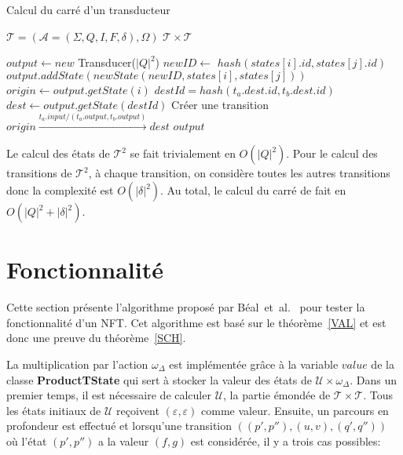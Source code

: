 	\begin{algorithm}
		\caption{Calcul du carré d'un transducteur}
		\label{square}
		\begin{algorithmic}[1]
			\Require $\mathscr{T} = (\mathscr{A} = (\Sigma,Q,I,F,\delta), \Omega)$
			\Ensure $\mathscr{T} \times \mathscr{T}$
			
			\Statex
			\State $output \leftarrow new$ Transducer($|Q|^2$)
			\Statex
			\Statex
					\State $newID \leftarrow$ $hash(states[i].id, states[j].id)$
					\State $output.addState(new State(newID, states[i], states[j]))$
				\EndFor
			\EndFor
			\Statex
			\Statex
				\State $origin \leftarrow output.getState(i)$
							\State $destId = hash(t_a.dest.id, t_b.dest.id)$
							\State $dest \leftarrow output.getState(destId)$
							\State Créer une transition $origin \xrightarrow{t_a.input / (t_a.output, t_b.output)} dest$
						\EndIf
					\EndFor
				\EndFor
			\EndFor
			\Statex
			\Return $output$
		\end{algorithmic}
	\end{algorithm}
	
	Le calcul des états de $\mathscr{T}^2$ se fait trivialement en $O(|Q|^2)$. Pour le calcul des transitions de $\mathscr{T}^2$, à chaque transition, on considère toutes les autres transitions donc la complexité est $O(|\delta|^2)$. Au total, le calcul du carré de fait en $O(|Q|^2 + |\delta|^2)$.
	
\section{Fonctionnalité}
\label{functionnal}

	Cette section présente l'algorithme proposé par Béal~et~al.~\cite{Bea03}  pour tester la fonctionnalité d'un NFT. Cet algorithme est basé sur le théorème~\ref{VAL} et est donc une preuve du théorème~\ref{SCH}.

	La multiplication par l'action $\omega_\Delta$ est implémentée grâce à la variable $value$ de la classe \textbf{ProductTState} qui sert à stocker la valeur des états de $\mathscr{U} \times \omega_\Delta$. Dans un premier temps, il est nécessaire de calculer $\mathscr{U}$, la partie émondée de $\mathscr{T} \times \mathscr{T}$. Tous les états initiaux de $\mathscr{U}$ reçoivent $(\varepsilon,\varepsilon)$ comme valeur. Ensuite, un parcours en profondeur est effectué et lorsqu'une transition $((p',p''),(u,v),(q',q''))$ où l'état $(p',p'')$ a la valeur $(f,g)$ est considérée, il y a trois cas possibles:

